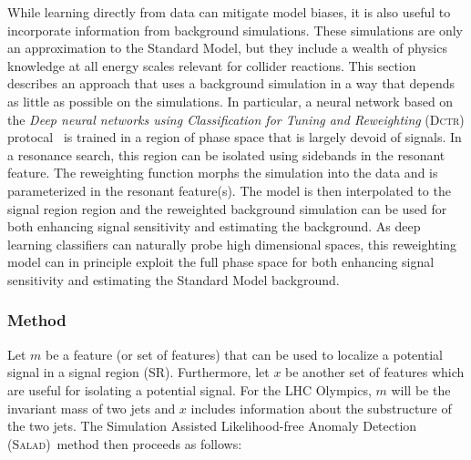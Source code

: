 \documentclass[a4paper,11pt]{article}
\begin{document}
\label{sec:salad}

While learning directly from data can mitigate model biases, it is also useful to incorporate information from background simulations.  These simulations are only an approximation to the Standard Model, but they include a wealth of physics knowledge at all energy scales relevant for collider reactions.  This section describes an approach that uses a background simulation in a way that depends as little as possible on the simulations.  In particular, a neural network based on the \textit{Deep neural networks using Classification for Tuning and Reweighting} (\textsc{Dctr}) protocal~\cite{Andreassen:2019nnm} is trained in a region of phase space that is largely devoid of signals.  In a resonance search, this region can be isolated using sidebands in the resonant feature.  The reweighting function morphs the simulation into the data and is parameterized in the resonant feature(s).  The model is then interpolated to the signal region region and the reweighted background simulation can be used for both enhancing signal sensitivity and estimating the background.  As deep learning classifiers can naturally probe high dimensional spaces, this reweighting model can in principle exploit the full phase space for both enhancing signal sensitivity and estimating the Standard Model background.


\subsubsection{Method}


Let $m$ be a feature (or set of features) that can be used to localize a potential signal in a signal region (SR).  Furthermore, let $x$ be another set of features which are useful for isolating a potential signal.  For the LHC Olympics, $m$ will be the invariant mass of two jets and $x$ includes information about the substructure of the two jets.   The Simulation Assisted Likelihood-free Anomaly Detection (\textsc{Salad})~method then proceeds as follows:
\end{document}
